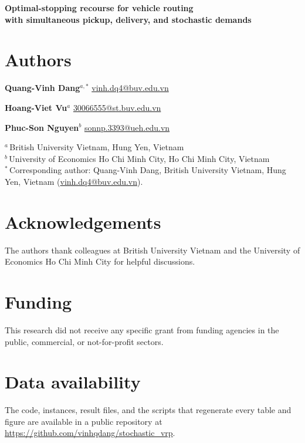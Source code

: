 \documentclass[11pt]{article}
\begin{document}
\begin{center}
{\LARGE\bfseries Optimal-stopping recourse for vehicle routing\\[2pt]
with simultaneous pickup, delivery, and stochastic demands}
\end{center}

\vspace{18pt}
\section*{Authors}

\textbf{Quang-Vinh Dang}$^{a,*}$\quad
\href{mailto:vinh.dq4@buv.edu.vn}{vinh.dq4@buv.edu.vn}

\textbf{Hoang-Viet Vu}$^{a}$\quad
\href{mailto:30066555@st.buv.edu.vn}{30066555@st.buv.edu.vn}

\textbf{Phuc-Son Nguyen}$^{b}$\quad
\href{mailto:sonnp.3393@ueh.edu.vn}{sonnp.3393@ueh.edu.vn}

\vspace{8pt}
$^{a}$\,British University Vietnam, Hung Yen, Vietnam\\
$^{b}$\,University of Economics Ho Chi Minh City, Ho Chi Minh City, Vietnam\\[6pt]
$^{*}$\,Corresponding author: Quang-Vinh Dang,
British University Vietnam, Hung Yen, Vietnam
(\href{mailto:vinh.dq4@buv.edu.vn}{vinh.dq4@buv.edu.vn}).

\section*{Acknowledgements}
The authors thank colleagues at British University Vietnam and the
University of Economics Ho Chi Minh City for helpful discussions.

\section*{Funding}
This research did not receive any specific grant from funding agencies
in the public, commercial, or not-for-profit sectors.

\section*{Data availability}
The code, instances, result files, and the scripts that regenerate
every table and figure are available in a public repository at
\url{https://github.com/vinhqdang/stochastic_vrp}.
\end{document}
